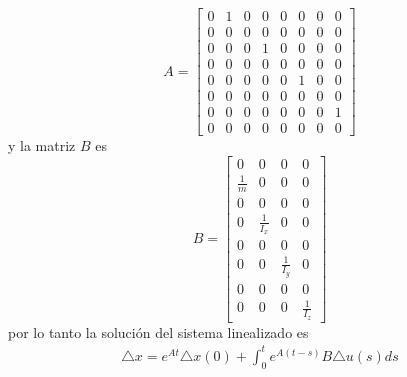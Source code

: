 \documentclass{uofa-eng-assignment}
\begin{document}
\[
A = \begin{bmatrix}
0 & 1 & 0 & 0 & 0 & 0 & 0 & 0 \\
0 & 0 & 0 & 0 & 0 & 0 & 0 & 0 \\
0 & 0 & 0 & 1 & 0 & 0 & 0 & 0 \\
0 & 0 & 0 & 0 & 0 & 0& 0 & 0  \\
0 & 0 & 0 & 0 & 0 & 1 & 0 & 0 \\
0 & 0 & 0 & 0 & 0 & 0 & 0 & 0 \\
0 & 0 & 0 & 0 & 0 & 0 & 0 & 1 \\
0 & 0 & 0 & 0 & 0 & 0 & 0 & 0 
\end{bmatrix}
\]
y la matriz $B$ es
\[
B = \begin{bmatrix}
0 & 0 & 0 & 0 \\
\frac{1}{m} & 0 & 0 & 0 \\
0 & 0 & 0 & 0 \\
0 & \frac{1}{I_x} & 0 & 0 \\
0 & 0 & 0 & 0 \\
0 & 0 & \frac{1}{I_y} & 0 \\
0 & 0 & 0 & 0 \\
0 & 0 & 0 & \frac{1}{I_z}
\end{bmatrix}
\]
por lo tanto la solución del sistema linealizado es
\begin{align*}
    \triangle x = e^{At} \triangle x(0) + \int_0^t e^{A(t-s)} B \triangle u(s) ds  
\end{align*}
\end{document}
